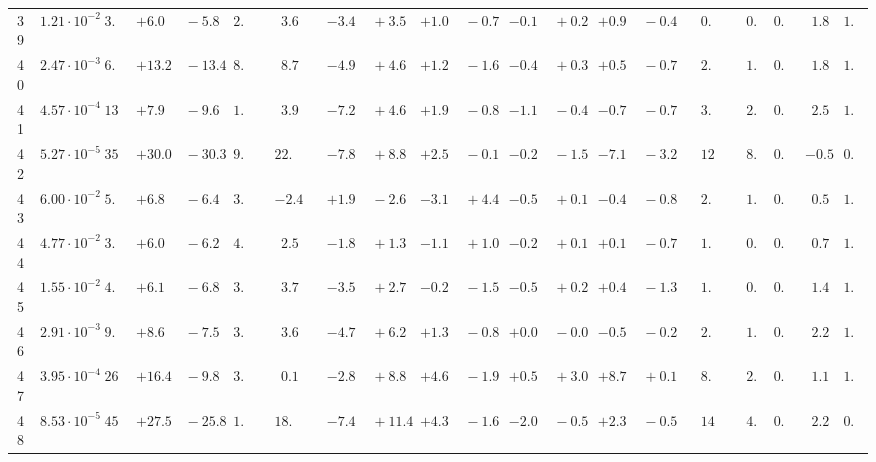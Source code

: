\documentclass[12pt]{article}
\begin{document}
\begin{table}
\begin{tabular}{ccrr@{\hskip0pt}rrc@{\hskip0pt}r@{\hskip0pt}c@{\hskip0pt}r@{\hskip0pt}rr@{\hskip0pt}rr@{\hskip0pt}rr@{\hskip0pt}rr@{\hskip0pt}r@{\hskip0pt}r@{\hskip0pt}c|rr|r}
39 &$1.21 \cdot 10^{-2}$ &$ 3.1$  & ${+6.0~}$&${~-5.8}$ & $ 2.5$  & &$ 3.6$&&${-3.4~}$&${~+3.5}$ & ${+1.0~}$&${~-0.7}$ & ${-0.1~}$&${~+0.2}$ & ${+0.9~}$&${~-0.4}$ & &$ 0.7$&&$ 0.4$  & $0.96$  & $ 1.8$  & $1.02$   \\ 
40 &$2.47 \cdot 10^{-3}$ &$ 6.7$  & ${+13.2~}$&${~-13.4}$ & $ 8.3$  & &$ 8.7$&&${-4.9~}$&${~+4.6}$ & ${+1.2~}$&${~-1.6}$ & ${-0.4~}$&${~+0.3}$ & ${+0.5~}$&${~-0.7}$ & &$ 2.1$&&$ 1.0$  & $0.96$  & $ 1.8$  & $1.03$   \\ 
41 &$4.57 \cdot 10^{-4}$ &$13.8$  & ${+7.9~}$&${~-9.6}$ & $ 1.1$  & &$ 3.9$&&${-7.2~}$&${~+4.6}$ & ${+1.9~}$&${~-0.8}$ & ${-1.1~}$&${~-0.4}$ & ${-0.7~}$&${~-0.7}$ & &$ 3.7$&&$ 2.5$  & $0.95$  & $ 2.5$  & $1.04$   \\ 
42 &$5.27 \cdot 10^{-5}$ &$35.2$  & ${+30.0~}$&${~-30.3}$ & $ 9.1$  & &$22.0$&&${-7.8~}$&${~+8.8}$ & ${+2.5~}$&${~-0.1}$ & ${-0.2~}$&${~-1.5}$ & ${-7.1~}$&${~-3.2}$ & &$12.8$&&$ 8.3$  & $0.97$  & $-0.5$  & $0.99$   \\ 
43 &$6.00 \cdot 10^{-2}$ &$ 5.9$  & ${+6.8~}$&${~-6.4}$ & $ 3.3$  & &$-2.4$&&${+1.9~}$&${~-2.6}$ & ${-3.1~}$&${~+4.4}$ & ${-0.5~}$&${~+0.1}$ & ${-0.4~}$&${~-0.8}$ & &$ 2.0$&&$ 1.1$  & $0.89$  & $ 0.5$  & $1.05$   \\ 
44 &$4.77 \cdot 10^{-2}$ &$ 3.7$  & ${+6.0~}$&${~-6.2}$ & $ 4.9$  & &$ 2.5$&&${-1.8~}$&${~+1.3}$ & ${-1.1~}$&${~+1.0}$ & ${-0.2~}$&${~+0.1}$ & ${+0.1~}$&${~-0.7}$ & &$ 1.1$&&$ 0.4$  & $0.95$  & $ 0.7$  & $1.03$   \\ 
45 &$1.55 \cdot 10^{-2}$ &$ 4.4$  & ${+6.1~}$&${~-6.8}$ & $ 3.5$  & &$ 3.7$&&${-3.5~}$&${~+2.7}$ & ${-0.2~}$&${~-1.5}$ & ${-0.5~}$&${~+0.2}$ & ${+0.4~}$&${~-1.3}$ & &$ 1.2$&&$ 0.5$  & $0.97$  & $ 1.4$  & $1.01$   \\ 
46 &$2.91 \cdot 10^{-3}$ &$ 9.5$  & ${+8.6~}$&${~-7.5}$ & $ 3.4$  & &$ 3.6$&&${-4.7~}$&${~+6.2}$ & ${+1.3~}$&${~-0.8}$ & ${+0.0~}$&${~-0.0}$ & ${-0.5~}$&${~-0.2}$ & &$ 2.4$&&$ 1.3$  & $0.96$  & $ 2.2$  & $1.02$   \\ 
47 &$3.95 \cdot 10^{-4}$ &$26.9$  & ${+16.4~}$&${~-9.8}$ & $ 3.0$  & &$ 0.1$&&${-2.8~}$&${~+8.8}$ & ${+4.6~}$&${~-1.9}$ & ${+0.5~}$&${~+3.0}$ & ${+8.7~}$&${~+0.1}$ & &$ 8.1$&&$ 2.8$  & $0.96$  & $ 1.1$  & $1.05$   \\ 
48 &$8.53 \cdot 10^{-5}$ &$45.8$  & ${+27.5~}$&${~-25.8}$ & $ 1.3$  & &$18.9$&&${-7.4~}$&${~+11.4}$ & ${+4.3~}$&${~-1.6}$ & ${-2.0~}$&${~-0.5}$ & ${+2.3~}$&${~-0.5}$ & &$14.7$&&$ 4.9$  & $0.96$  & $ 2.2$  & $0.97$   \\ 
\hline
\hline
\end{tabular}


\end{table}
\end{document}
